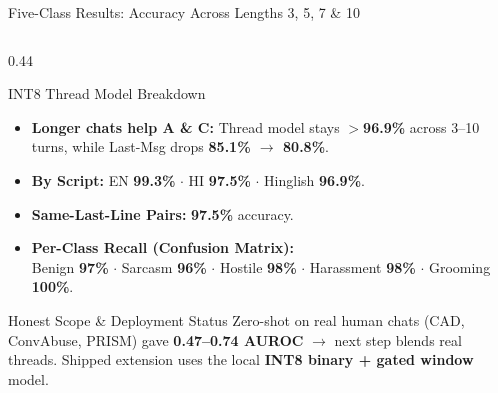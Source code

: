 \documentclass[aspectratio=169,10pt]{beamer}
\begin{document}
\begin{frame}{Five-Class Results: Accuracy Across Lengths 3, 5, 7 \& 10}
\begin{columns}[c]
    \begin{column}{0.44\textwidth}
      \begin{softcard}[snGreen!55]{INT8 Thread Model Breakdown}
        \scriptsize
        \begin{itemize}
          \setlength\itemsep{2.5pt}
          \item \textbf{Longer chats help A \& C:} Thread model stays \textbf{$>$96.9\%} across 3--10 turns, while Last-Msg drops \textbf{85.1\% $\rightarrow$ 80.8\%}.
          \item \textbf{By Script:} EN \textbf{99.3\%} $\cdot$ HI \textbf{97.5\%} $\cdot$ Hinglish \textbf{96.9\%}.
          \item \textbf{Same-Last-Line Pairs:} \textbf{97.5\%} accuracy.
          \item \textbf{Per-Class Recall (Confusion Matrix):}\\
                Benign \textbf{97\%} $\cdot$ Sarcasm \textbf{96\%} $\cdot$ Hostile \textbf{98\%} $\cdot$ Harassment \textbf{98\%} $\cdot$ Grooming \textbf{100\%}.
        \end{itemize}
      \end{softcard}

      \vspace{0.18cm}
      \begin{accentcard}[snAmber]{Honest Scope \& Deployment Status}
        \fontsize{6.6}{7.8}\selectfont
        Zero-shot on real human chats (CAD, ConvAbuse, PRISM) gave \textbf{0.47--0.74 AUROC} $\rightarrow$ next step blends real threads. Shipped extension uses the local \textbf{INT8 binary + gated window} model.
      \end{accentcard}
    \end{column}
  \end{columns}
\end{frame}
\end{document}
